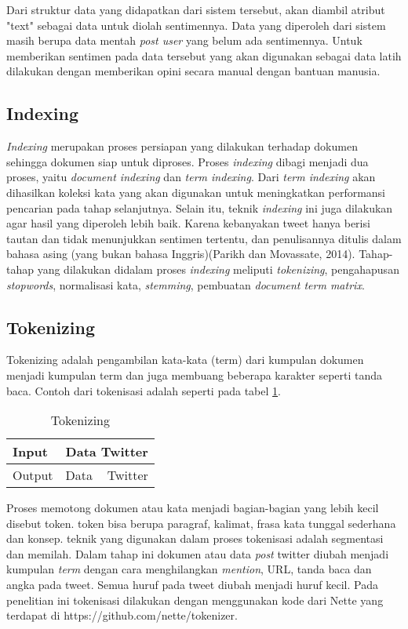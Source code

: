 Dari struktur data yang didapatkan dari sistem tersebut, akan diambil atribut "text" sebagai data untuk diolah sentimennya. Data yang diperoleh dari sistem masih berupa data mentah \textit{post user} yang belum ada sentimennya. Untuk memberikan sentimen pada data tersebut yang akan digunakan sebagai data latih dilakukan dengan memberikan opini secara manual dengan bantuan manusia. 


\subsection*{Indexing}

\textit{Indexing} merupakan proses persiapan yang dilakukan terhadap dokumen sehingga dokumen siap untuk diproses. Proses \textit{indexing} dibagi menjadi dua proses, yaitu \textit{document indexing} dan \textit{term indexing}. Dari \textit{term indexing} akan dihasilkan koleksi kata yang akan digunakan untuk meningkatkan performansi pencarian pada tahap selanjutnya.  Selain itu, teknik \textit{indexing} ini juga dilakukan agar hasil yang diperoleh lebih baik. Karena kebanyakan tweet hanya berisi tautan dan tidak menunjukkan sentimen tertentu, dan penulisannya ditulis dalam bahasa asing (yang bukan bahasa Inggris)(Parikh dan Movassate, 2014). Tahap-tahap yang dilakukan didalam proses \textit{indexing} meliputi \textit{tokenizing}, pengahapusan \textit{stopwords}, normalisasi kata, \textit{stemming}, pembuatan \textit{document term matrix}.


\subsection*{Tokenizing}
Tokenizing adalah pengambilan kata-kata (term) dari kumpulan dokumen menjadi kumpulan term dan juga membuang beberapa karakter seperti tanda baca. Contoh dari tokenisasi adalah seperti pada tabel \ref{tab:tokenizing}.

\begin{table}[hbt]
	\caption{Tokenizing}
	\centering
	\begin{tabular}{llr}
		\toprule
		Input & \multicolumn{2}{c}{Data Twitter} \\
		\midrule
		Output & Data & Twitter \\
		\bottomrule
	\end{tabular}
	\label{tab:tokenizing}
\end{table}

Proses memotong dokumen atau kata menjadi bagian-bagian yang lebih kecil disebut token. token bisa berupa paragraf, kalimat, frasa kata tunggal sederhana dan konsep. teknik yang digunakan dalam proses tokenisasi adalah segmentasi dan memilah.
Dalam tahap ini dokumen atau data \textit{post} twitter diubah menjadi kumpulan \textit{term} dengan cara menghilangkan \textit{mention}, URL, tanda baca dan angka pada tweet. Semua huruf pada tweet diubah menjadi huruf kecil. Pada penelitian ini tokenisasi dilakukan dengan menggunakan kode dari Nette yang terdapat di https://github.com/nette/tokenizer.


